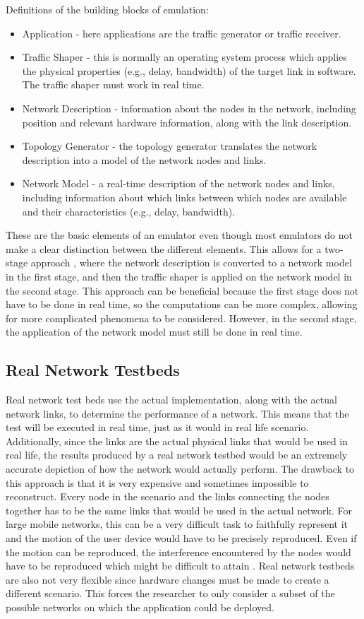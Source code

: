 Definitions of the building blocks of emulation:
\begin{itemize}
	\item Application - here applications are the traffic generator or traffic receiver.
	\item Traffic Shaper - this is normally an operating system process which applies the physical properties (e.g., delay, bandwidth) of the target link in software. The traffic shaper must work in real time.
	\item Network Description - information about the nodes in the network, including position and relevant hardware information, along with the link description.
	\item Topology Generator - the topology generator translates the network description into a model of the network nodes and links.
	\item Network Model - a real-time description of the network nodes and links, including information about which links between which nodes are available and their characteristics (e.g., delay, bandwidth).
\end{itemize}

These are the basic elements of an emulator even though most emulators do not make a clear distinction between the different elements. This allows for a two-stage approach \cite{Perennou2005}, where the network description is converted to a network model in the first stage, and then the traffic shaper is applied on the network model in the second stage. This approach can be beneficial because the first stage does not have to be done in real time, so the computations can be more complex, allowing for more complicated phenomena to be considered. However, in the second stage, the application of the network model must still be done in real time.

\subsection{Real Network Testbeds}
Real network test beds use the actual implementation, along with the actual network links, to determine the performance of a network. This means that the test will be executed in real time, just as it would in real life scenario. Additionally, since the links are the actual physical links that would be used in real life, the results produced by a real network testbed would be an extremely accurate depiction of how the network would actually perform. The drawback to this approach is that it is very expensive and sometimes impossible to reconstruct. Every node in the scenario and the links connecting the nodes together has to be the same links that would be used in the actual network. For large mobile networks, this can be a very difficult task to faithfully represent it and the motion of the user device would have to be precisely reproduced. Even if the motion can be reproduced, the interference encountered by the nodes would have to be reproduced which might be difficult to attain \cite{Noble:1997:TMN:263109.263140}. Real network testbeds are also not very flexible since hardware changes must be made to create a different scenario. This forces the researcher to only consider a subset of the possible networks on which the application could be deployed.

